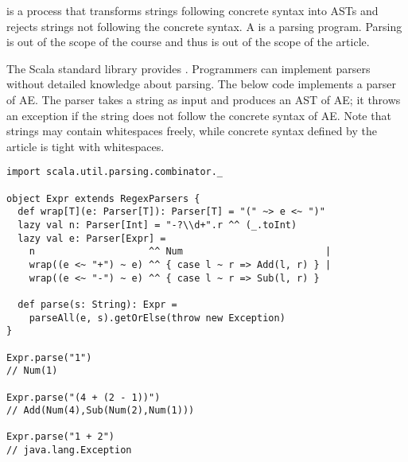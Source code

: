  is a process that transforms strings following concrete syntax
into ASTs and rejects strings not following the concrete syntax. A 
is a parsing program. Parsing is out of the scope of the course and thus is out
of the scope of the article.

The Scala standard library provides . Programmers can
implement parsers without detailed knowledge about parsing. The below code
implements a parser of AE. The parser takes a string as input and produces an AST
of AE; it throws an exception if the string does not follow the concrete syntax
of AE. Note that strings may contain whitespaces freely, while concrete syntax
defined by the article is tight with whitespaces.

\begin{verbatim}
import scala.util.parsing.combinator._

object Expr extends RegexParsers {
  def wrap[T](e: Parser[T]): Parser[T] = "(" ~> e <~ ")"
  lazy val n: Parser[Int] = "-?\\d+".r ^^ (_.toInt)
  lazy val e: Parser[Expr] =
    n                    ^^ Num                         |
    wrap((e <~ "+") ~ e) ^^ { case l ~ r => Add(l, r) } |
    wrap((e <~ "-") ~ e) ^^ { case l ~ r => Sub(l, r) }

  def parse(s: String): Expr =
    parseAll(e, s).getOrElse(throw new Exception)
}

Expr.parse("1")
// Num(1)

Expr.parse("(4 + (2 - 1))")
// Add(Num(4),Sub(Num(2),Num(1)))

Expr.parse("1 + 2")
// java.lang.Exception
\end{verbatim}
